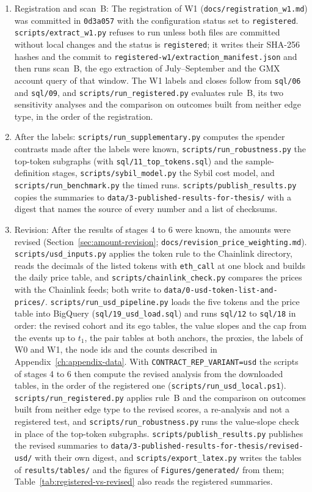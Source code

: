 \begin{enumerate}
\item Registration and scan~B: The registration of W1 (\texttt{docs/registration\_w1.md}) was committed in \texttt{0d3a057} with the configuration status set to \texttt{registered}. \texttt{scripts/extract\_w1.py} refuses to run unless both files are committed without local changes and the status is \texttt{registered}; it writes their SHA-256 hashes and the commit to \texttt{registered-w1/extraction\_manifest.json} and then runs scan~B, the ego extraction of July--September and the GMX account query of that window. The W1 labels and closes follow from \texttt{sql/06} and \texttt{sql/09}, and \texttt{scripts/run\_registered.py} evaluates rule~B, its two sensitivity analyses and the comparison on outcomes built from neither edge type, in the order of the registration.
\item After the labels: \texttt{scripts/run\_supplementary.py} computes the spender contrasts made after the labels were known, \texttt{scripts/run\_robustness.py} the top-token subgraphs (with \texttt{sql/11\_top\_tokens.sql}) and the sample-definition stages, \texttt{scripts/sybil\_model.py} the Sybil cost model, and \texttt{scripts/run\_benchmark.py} the timed runs. \texttt{scripts/publish\_results.py} copies the summaries to \texttt{data/3-published-results-for-thesis/} with a digest that names the source of every number and a list of checksums.
\item Revision: After the results of stages 4 to 6 were known, the amounts were revised (Section~\ref{sec:amount-revision}; \texttt{docs/revision\_price\_weighting.md}). \texttt{scripts/usd\_inputs.py} applies the token rule to the Chainlink directory, reads the decimals of the listed tokens with \texttt{eth\_call} at one block and builds the daily price table, and \texttt{scripts/chainlink\_check.py} compares the prices with the Chainlink feeds; both write to \texttt{data/0-usd-token-list-and-prices/}. \texttt{scripts/run\_usd\_pipeline.py} loads the five tokens and the price table into BigQuery (\texttt{sql/19\_usd\_load.sql}) and runs \texttt{sql/12} to \texttt{sql/18} in order: the revised cohort and its ego tables, the value slopes and the cap from the events up to $t_1$, the pair tables at both anchors, the proxies, the labels of W0 and W1, the node ids and the counts described in Appendix~\ref{ch:appendix-data}. With \texttt{CONTRACT\_REP\_VARIANT=usd} the scripts of stages 4 to 6 then compute the revised analysis from the downloaded tables, in the order of the registered one (\texttt{scripts/run\_usd\_local.ps1}). \texttt{scripts/run\_registered.py} applies rule~B and the comparison on outcomes built from neither edge type to the revised scores, a re-analysis and not a registered test, and \texttt{scripts/run\_robustness.py} runs the value-slope check in place of the top-token subgraphs. \texttt{scripts/publish\_results.py} publishes the revised summaries to \texttt{data/3-published-results-for-thesis/revised-usd/} with their own digest, and \texttt{scripts/export\_latex.py} writes the tables of \texttt{results/tables/} and the figures of \texttt{Figures/generated/} from them; Table~\ref{tab:registered-vs-revised} also reads the registered summaries.
\end{enumerate}

